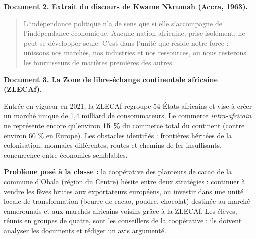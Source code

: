 \documentclass[11pt]{article}
\newcommand{\cle}[1]{{\popxbold\color{popdark}#1}}
\newcounter{popsec}
\newcounter{popsub}
\newcommand{\courssub}[1]{%
  \stepcounter{popsub}%
  \par\vspace{9pt}\noindent{\popxbold\fontsize{11.5}{13}\selectfont\color{popink}{\color{poporange}\thepopsec.\thepopsub}\hspace{6pt}#1}\par\nopagebreak\vspace{4pt}
}
\begin{document}
\textbf{Document 2. Extrait du discours de Kwame Nkrumah (Accra, 1963).}

\begin{quote}
\og L'indépendance politique n'a de sens que si elle s'accompagne de l'indépendance économique. Aucune nation africaine, prise isolément, ne peut se développer seule. C'est dans l'unité que réside notre force : unissons nos marchés, nos industries et nos ressources, ou nous resterons les fournisseurs de matières premières des autres. \fg
\end{quote}

\textbf{Document 3. La Zone de libre-échange continentale africaine (ZLECAf).}

Entrée en vigueur en 2021, la \cle{ZLECAf} regroupe 54 États africains et vise à créer un marché unique de 1,4 milliard de consommateurs. Le commerce \emph{intra-africain} ne représente encore qu'environ \textbf{15 \%} du commerce total du continent (contre environ 60 \% en Europe). Les obstacles identifiés : frontières héritées de la colonisation, monnaies différentes, routes et chemins de fer insuffisants, concurrence entre économies semblables.

\textbf{Problème posé à la classe :} la coopérative des planteurs de cacao de la commune d'Obala (région du Centre) hésite entre deux stratégies : continuer à vendre les fèves brutes aux exportateurs européens, ou investir dans une unité locale de transformation (beurre de cacao, poudre, chocolat) destinée au marché camerounais et aux marchés africains voisins grâce à la ZLECAf. Les élèves, réunis en groupes de quatre, sont les conseillers de la coopérative : ils doivent analyser les documents et rédiger un avis argumenté.

\courssub{Consignes}
\end{document}
